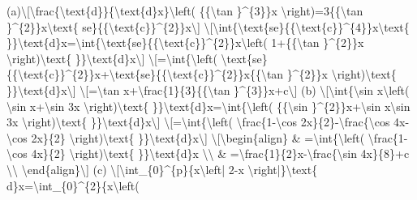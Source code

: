 \item (a)\textbackslash{[}\textbackslash frac\{\textbackslash text\{d\}\}\{\textbackslash text\{d\}x\}\textbackslash left(
\{\{\textbackslash tan \}\textasciicircum\{3\}\}x \textbackslash right)=3\{\{\textbackslash tan
\}\textasciicircum\{2\}\}x\textbackslash text\{ se\}\{\{\textbackslash text\{c\}\}\textasciicircum\{2\}\}x\textbackslash{]}
\textbackslash{[}\textbackslash int\{\textbackslash text\{se\}\{\{\textbackslash text\{c\}\}\textasciicircum\{4\}\}x\textbackslash text\{
\}\}\textbackslash text\{d\}x=\textbackslash int\{\textbackslash text\{se\}\{\{\textbackslash text\{c\}\}\textasciicircum\{2\}\}x\textbackslash left(
1+\{\{\textbackslash tan \}\textasciicircum\{2\}\}x \textbackslash right)\textbackslash text\{
\}\}\textbackslash text\{d\}x\textbackslash{]} \textbackslash{[}=\textbackslash int\{\textbackslash left(
\textbackslash text\{se\}\{\{\textbackslash text\{c\}\}\textasciicircum\{2\}\}x+\textbackslash text\{se\}\{\{\textbackslash text\{c\}\}\textasciicircum\{2\}\}x\{\{\textbackslash tan
\}\textasciicircum\{2\}\}x \textbackslash right)\textbackslash text\{
\}\}\textbackslash text\{d\}x\textbackslash{]} \textbackslash{[}=\textbackslash tan
x+\textbackslash frac\{1\}\{3\}\{\{\textbackslash tan \}\textasciicircum\{3\}\}x+c\textbackslash{]}
(b) \textbackslash{[}\textbackslash int\{\textbackslash sin x\textbackslash left(
\textbackslash sin x+\textbackslash sin 3x \textbackslash right)\textbackslash text\{
\}\}\textbackslash text\{d\}x=\textbackslash int\{\textbackslash left(
\{\{\textbackslash sin \}\textasciicircum\{2\}\}x+\textbackslash sin
x\textbackslash sin 3x \textbackslash right)\textbackslash text\{
\}\}\textbackslash text\{d\}x\textbackslash{]} \textbackslash{[}=\textbackslash int\{\textbackslash left(
\textbackslash frac\{1-\textbackslash cos 2x\}\{2\}-\textbackslash frac\{\textbackslash cos
4x-\textbackslash cos 2x\}\{2\} \textbackslash right)\textbackslash text\{
\}\}\textbackslash text\{d\}x\textbackslash{]} \textbackslash{[}\textbackslash begin\{align\}
\& =\textbackslash int\{\textbackslash left( \textbackslash frac\{1-\textbackslash cos
4x\}\{2\} \textbackslash right)\textbackslash text\{ \}\}\textbackslash text\{d\}x
\textbackslash\textbackslash{} \& =\textbackslash frac\{1\}\{2\}x-\textbackslash frac\{\textbackslash sin
4x\}\{8\}+c \textbackslash\textbackslash{} \textbackslash end\{align\}\textbackslash{]}
(c) \textbackslash{[}\textbackslash int\_\{0\}\textasciicircum\{p\}\{x\textbackslash left|
2-x \textbackslash right|\}\textbackslash text\{ d\}x=\textbackslash int\_\{0\}\textasciicircum\{2\}\{x\textbackslash left(
